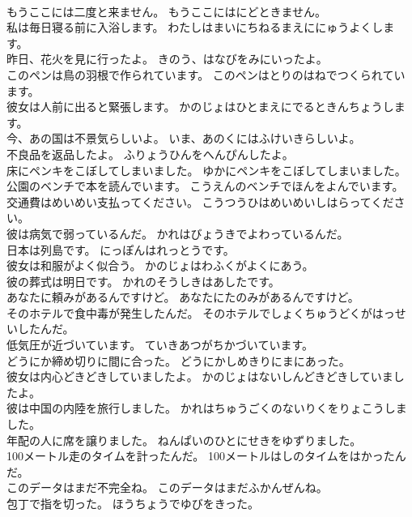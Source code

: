 \documentclass[8pt]{extreport}
\begin{document}
\begin{CJK}{UTF8}{min}
\\	もうここには二度と来ません。	もうここにはにどときません。 
\\	私は毎日寝る前に入浴します。	わたしはまいにちねるまえににゅうよくします。 
\\	昨日、花火を見に行ったよ。	きのう、はなびをみにいったよ。 
\\	このペンは鳥の羽根で作られています。	このペンはとりのはねでつくられています。 
\\	彼女は人前に出ると緊張します。	かのじょはひとまえにでるときんちょうします。 
\\	今、あの国は不景気らしいよ。	いま、あのくにはふけいきらしいよ。 
\\	不良品を返品したよ。	ふりょうひんをへんぴんしたよ。 
\\	床にペンキをこぼしてしまいました。	ゆかにペンキをこぼしてしまいました。 
\\	公園のベンチで本を読んでいます。	こうえんのベンチでほんをよんでいます。 
\\	交通費はめいめい支払ってください。	こうつうひはめいめいしはらってください。 
\\	彼は病気で弱っているんだ。	かれはびょうきでよわっているんだ。 
\\	日本は列島です。	にっぽんはれっとうです。 
\\	彼女は和服がよく似合う。	かのじょはわふくがよくにあう。 
\\	彼の葬式は明日です。	かれのそうしきはあしたです。 
\\	あなたに頼みがあるんですけど。	あなたにたのみがあるんですけど。 
\\	そのホテルで食中毒が発生したんだ。	そのホテルでしょくちゅうどくがはっせいしたんだ。 
\\	低気圧が近づいています。	ていきあつがちかづいています。 
\\	どうにか締め切りに間に合った。	どうにかしめきりにまにあった。 
\\	彼女は内心どきどきしていましたよ。	かのじょはないしんどきどきしていましたよ。 
\\	彼は中国の内陸を旅行しました。	かれはちゅうごくのないりくをりょこうしました。 
\\	年配の人に席を譲りました。	ねんぱいのひとにせきをゆずりました。 
\\	100メートル走のタイムを計ったんだ。	100メートルはしのタイムをはかったんだ。 
\\	このデータはまだ不完全ね。	このデータはまだふかんぜんね。 
\\	包丁で指を切った。	ほうちょうでゆびをきった。 

\end{CJK}
\end{document}
